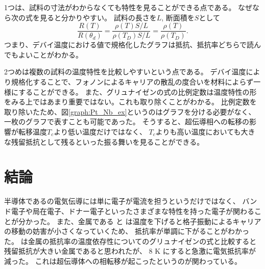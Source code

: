 \documentclass[11pt,dvipdfmx,a4paper]{jsarticle}
\begin{document}
1つは、試料の寸法がわからなくても特性を見ることができる点である。
なぜなら次の式を見ると分かりやすい。
試料の長さを\(L\), 断面積を\(S\)として
\begin{equation}
    \frac{R(T)}{R(\theta_d)} = \frac{\rho(T)S/L}{\rho(T_D)S/L} = \frac{\rho(T)}{\rho(T_D)}.
\end{equation}
つまり、デバイ温度における値で規格化したグラフは抵抗、抵抗率どちらで読んでもよいことがわかる。

2つめは複数の試料の温度特性を比較しやすいという点である。
デバイ温度により規格化することで、フォノンによるキャリアの散乱の度合いを材料によらず一様にすることができる。
また、グリュナイゼンの式の比例定数は温度特性の形をみる上ではあまり重要ではない。これも取り除くことがわかる。
比例定数を取り除いたため、図\ref{graph:Pt_Nb_ex}というのはグラフを分ける必要がなく、一枚のグラフで表すことも可能であった。
そうすると、超伝導相への転移の影響が転移温度\(T_c\)より低い温度だけではなく、
\(T_c\)よりも高い温度においても大きな残留抵抗として残るといった振る舞いを見ることができる。


\section{結論}
半導体であるの電気伝導には単に電子が電流を担うというだけではなく、
バンド電子や局在電子、ドナー電子といったさまざまな特性を持った電子が関わることが分かった。
また、金属である と  は温度を下げると格子振動によるキャリアの移動の妨害が小さくなっていくため、
抵抗率が単調に下がることがわかった。
 は金属の抵抗率の温度依存性についてのグリュナイゼンの式と比較すると残留抵抗が大きい金属であると思われたが、
8 K にすると急激に電気抵抗率が減った。
これは超伝導体への相転移が起こったというのが関わっている。




\end{document}
